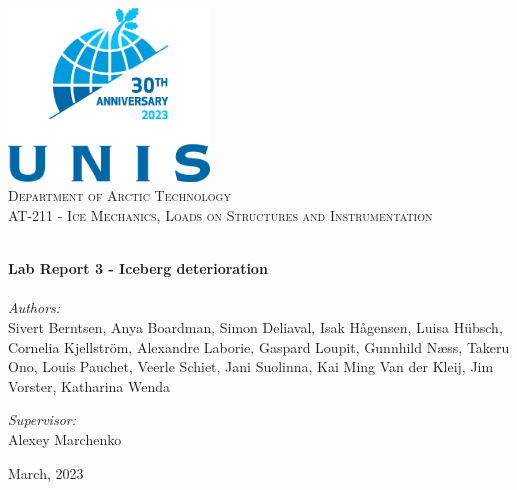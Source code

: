 \begin{titlepage}
\vbox{}
\vbox{}
\begin{center}
\includegraphics[width=0.40\textwidth]{Images/UNIS_logo.png}\\[2cm]
\textsc{\LARGE Department of Arctic Technology}\\[1.5cm]
\textsc{\Large AT-211 - Ice Mechanics, Loads on Structures and Instrumentation}\\[0.5cm]
\vbox{}

\HRule \\[0.5cm]
{ \huge \bfseries Lab Report 3 - Iceberg deterioration}\\[0.5cm]
\HRule \\[1.5cm]

\large
\emph{Authors:}\\
Sivert Berntsen, Anya Boardman, Simon Deliaval, Isak Hågensen, Luisa Hübsch, Cornelia Kjellström, Alexandre Laborie, Gaspard Loupit, Gunnhild Næss, Takeru Ono, Louis Pauchet, Veerle Schiet, Jani Suolinna, Kai Ming Van der Kleij, Jim Vorster, Katharina Wenda

\emph{Supervisor:}\\
Alexey Marchenko

\vfill

{\large March, 2023}
\end{center}
\end{titlepage}